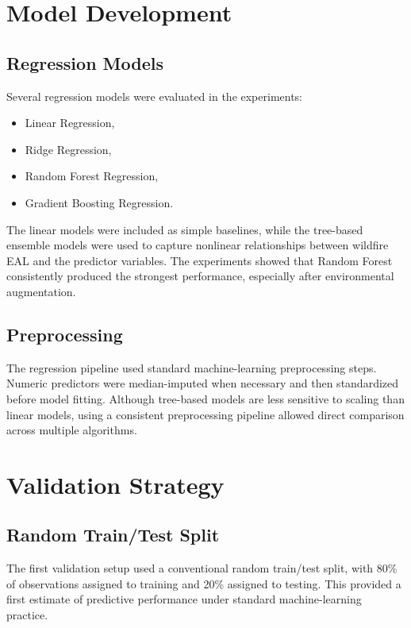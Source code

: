 \section{Model Development}

\subsection{Regression Models}

Several regression models were evaluated in the experiments:
\begin{itemize}
    \item Linear Regression,
    \item Ridge Regression,
    \item Random Forest Regression,
    \item Gradient Boosting Regression.
\end{itemize}

The linear models were included as simple baselines, while the tree-based ensemble models were used to capture nonlinear relationships between wildfire EAL and the predictor variables. The experiments showed that Random Forest consistently produced the strongest performance, especially after environmental augmentation.

\subsection{Preprocessing}

The regression pipeline used standard machine-learning preprocessing steps. Numeric predictors were median-imputed when necessary and then standardized before model fitting. Although tree-based models are less sensitive to scaling than linear models, using a consistent preprocessing pipeline allowed direct comparison across multiple algorithms.

\section{Validation Strategy}

\subsection{Random Train/Test Split}

The first validation setup used a conventional random train/test split, with 80\% of observations assigned to training and 20\% assigned to testing. This provided a first estimate of predictive performance under standard machine-learning practice.

